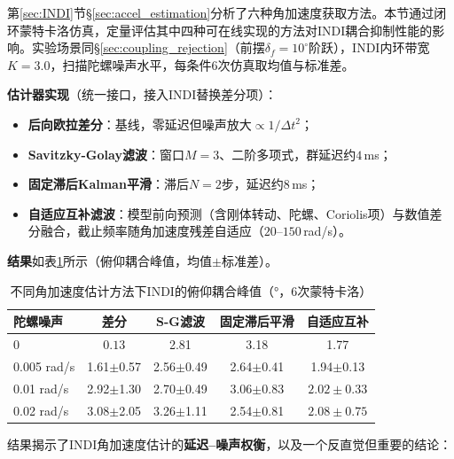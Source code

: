 第\ref{sec:INDI}节§\ref{sec:accel_estimation}分析了六种角加速度获取方法。本节通过闭环蒙特卡洛仿真，定量评估其中四种可在线实现的方法对INDI耦合抑制性能的影响。实验场景同§\ref{sec:coupling_rejection}（前摆$\delta_f=10^\circ$阶跃），INDI内环带宽$K=3.0$，扫描陀螺噪声水平，每条件6次仿真取均值与标准差。

\textbf{估计器实现}（统一接口，接入INDI替换差分项）：
\begin{itemize}
    \item \textbf{后向欧拉差分}：基线，零延迟但噪声放大$\propto 1/\Delta t^2$；
    \item \textbf{Savitzky-Golay滤波}：窗口$M=3$、二阶多项式，群延迟约$4$\,ms；
    \item \textbf{固定滞后Kalman平滑}：滞后$N=2$步，延迟约$8$\,ms；
    \item \textbf{自适应互补滤波}：模型前向预测（含刚体转动、陀螺、Coriolis项）与数值差分融合，截止频率随角加速度残差自适应（$20$--$150$\,rad/s）。
\end{itemize}

\textbf{结果}如表\ref{tab:estimator_compare}所示（俯仰耦合峰值，均值$\pm$标准差）。

\begin{table}[H]
\centering
\caption{不同角加速度估计方法下INDI的俯仰耦合峰值（°，6次蒙特卡洛）}
\label{tab:estimator_compare}
\small
\begin{tabular}{l c c c c}
\toprule
\textbf{陀螺噪声} & \textbf{差分} & \textbf{S-G滤波} & \textbf{固定滞后平滑} & \textbf{自适应互补} \\
\midrule
0 & $\mathbf{0.13}$ & 2.81 & 3.18 & 1.77 \\
0.005 rad/s & 1.61$\pm$0.57 & 2.56$\pm$0.49 & 2.64$\pm$0.41 & 1.94$\pm$0.13 \\
0.01 rad/s & 2.92$\pm$1.30 & 2.70$\pm$0.49 & 3.06$\pm$0.83 & $\mathbf{2.02\pm0.33}$ \\
0.02 rad/s & 3.08$\pm$2.05 & 3.26$\pm$1.11 & 2.54$\pm$0.81 & $\mathbf{2.08\pm0.75}$ \\
\bottomrule
\end{tabular}
\end{table}

结果揭示了INDI角加速度估计的\textbf{延迟--噪声权衡}，以及一个反直觉但重要的结论：


